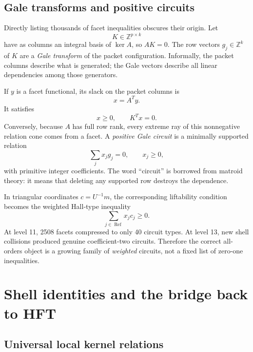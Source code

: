 \documentclass[11pt,a4paper]{article}
\theoremstyle{definition}
\begin{document}
\subsection{Gale transforms and positive circuits}

Directly listing thousands of facet inequalities obscures their origin.  Let
\[
   K\in\mathbb Z^{p\times k}
\]
have as columns an integral basis of $\ker A$, so $AK=0$.  The row
vectors $g_j\in\mathbb Z^k$ of $K$ are a \emph{Gale transform} of the packet
configuration.  Informally, the packet columns describe what is generated;
the Gale vectors describe all linear dependencies among those generators.

If $y$ is a facet functional, its slack on the packet columns is
\[
   x=A^Ty.
\]
It satisfies
\[
   x\geq0,
   \qquad K^Tx=0.
\]
Conversely, because $A$ has full row rank, every extreme ray of this
nonnegative relation cone comes from a facet.  A \emph{positive Gale circuit}
is a minimally supported relation
\[
   \sum_j x_jg_j=0,
   \qquad x_j\geq0,
\]
with primitive integer coefficients.  The word ``circuit'' is borrowed from
matroid theory: it means that deleting any supported row destroys the
dependence.

In triangular coordinates $c=U^{-1}m$, the corresponding liftability
condition becomes the weighted Hall-type inequality
\begin{equation}
\label{eq:weighted-circuit}
   \sum_{j\in\operatorname{Ref}}x_jc_j\geq0.
\end{equation}
At level 11, 2508 facets compressed to only 40 circuit types.  At level 13,
new shell collisions produced genuine coefficient-two circuits.  Therefore
the correct all-orders object is a growing family of \emph{weighted}
circuits, not a fixed list of zero-one inequalities.

\section{Shell identities and the bridge back to HFT}

\subsection{Universal local kernel relations}
\end{document}
